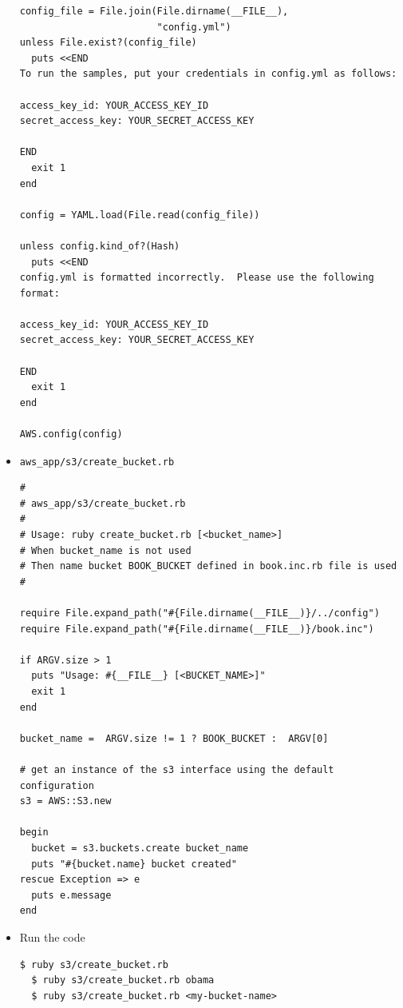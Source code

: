 \documentclass{beamer}
\begin{document}
\begin{frame}
\begin{itemize}
\begin{lstlisting}[escapechar=$]
config_file = File.join(File.dirname(__FILE__),
                        "config.yml")
unless File.exist?(config_file)
  puts <<END
To run the samples, put your credentials in config.yml as follows:

access_key_id: YOUR_ACCESS_KEY_ID
secret_access_key: YOUR_SECRET_ACCESS_KEY

END
  exit 1
end

config = YAML.load(File.read(config_file))

unless config.kind_of?(Hash)
  puts <<END
config.yml is formatted incorrectly.  Please use the following format:

access_key_id: YOUR_ACCESS_KEY_ID
secret_access_key: YOUR_SECRET_ACCESS_KEY

END
  exit 1
end

AWS.config(config)
\end{lstlisting}

\item \texttt{aws\_app/s3/create\_bucket.rb}
\lstset{language=Ruby, style=eclipse}
\begin{lstlisting}[escapechar=$]
#
# aws_app/s3/create_bucket.rb
#
# Usage: ruby create_bucket.rb [<bucket_name>]
# When bucket_name is not used
# Then name bucket BOOK_BUCKET defined in book.inc.rb file is used
#

require File.expand_path("#{File.dirname(__FILE__)}/../config")
require File.expand_path("#{File.dirname(__FILE__)}/book.inc")

if ARGV.size > 1
  puts "Usage: #{__FILE__} [<BUCKET_NAME>]"
  exit 1
end

bucket_name =  ARGV.size != 1 ? BOOK_BUCKET :  ARGV[0]

# get an instance of the s3 interface using the default configuration
s3 = AWS::S3.new

begin
  bucket = s3.buckets.create bucket_name
  puts "#{bucket.name} bucket created"
rescue Exception => e
  puts e.message
end
\end{lstlisting}

\item Run the code
\lstset{language=shell}
\begin{lstlisting}[escapechar=!]
  $ ruby s3/create_bucket.rb
  $ ruby s3/create_bucket.rb obama
  $ ruby s3/create_bucket.rb <my-bucket-name>
\end{lstlisting}

\end{itemize}
\end{frame}
\end{document}
